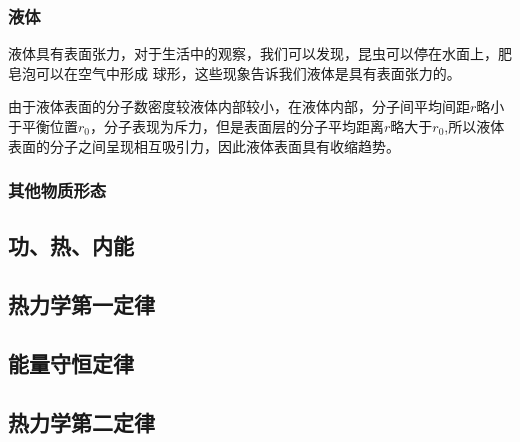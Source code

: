 \subsubsection{液体}
液体具有表面张力，对于生活中的观察，我们可以发现，昆虫可以停在水面上，肥皂泡可以在空气中形成 球形，这些现象告诉我们液体是具有表面张力的。

由于液体表面的分子数密度较液体内部较小，在液体内部，分子间平均间距$r$略小于平衡位置$r_0$，分子表现为斥力，但是表面层的分子平均距离$r$略大于$r_0$,所以液体表面的分子之间呈现相互吸引力，因此液体表面具有收缩趋势。

\subsubsection{其他物质形态}

\subsection{功、热、内能}
\subsection{热力学第一定律}
\subsection{能量守恒定律}
\subsection{热力学第二定律}

 


